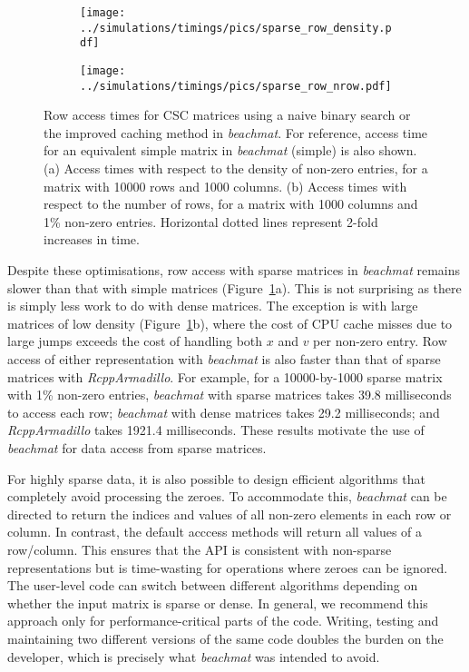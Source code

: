 \documentclass[10pt,letterpaper]{article}
\newcommand{\beachmat}{\textit{beachmat}}
\begin{document}
\begin{figure}[btp]
    \begin{subfigure}[b]{0.49\textwidth}
        \texttt{[image: ../simulations/timings/pics/sparse\_row\_density.pdf]}
        \caption{}
    \end{subfigure}
    \begin{subfigure}[b]{0.49\textwidth}
        \texttt{[image: ../simulations/timings/pics/sparse\_row\_nrow.pdf]}
        \caption{}
    \end{subfigure}
    \caption{Row access times for CSC matrices using a naive binary search or the improved caching method in \beachmat{}.
        For reference, access time for an equivalent simple matrix in \beachmat{} (simple) is also shown.
        (a) Access times with respect to the density of non-zero entries, for a matrix with 10000 rows and 1000 columns.
        (b) Access times with respect to the number of rows, for a matrix with 1000 columns and 1\% non-zero entries.
        Horizontal dotted lines represent 2-fold increases in time.
    }
    \label{fig:sparserow}
\end{figure}


Despite these optimisations, row access with sparse matrices in \beachmat{} remains slower than that with simple matrices (Figure~\ref{fig:sparserow}a).
This is not surprising as there is simply less work to do with dense matrices.
The exception is with large matrices of low density (Figure~\ref{fig:sparserow}b), where the cost of CPU cache misses due to large jumps exceeds the cost of handling both $x$ and $v$ per non-zero entry.
Row access of either representation with \beachmat{} is also faster than that of sparse matrices with \textit{RcppArmadillo}.
For example, for a 10000-by-1000 sparse matrix with 1\% non-zero entries, \beachmat{} with sparse matrices takes 39.8 milliseconds to access each row; \beachmat{} with dense matrices takes 29.2 milliseconds; and \textit{RcppArmadillo} takes 1921.4 milliseconds.
These results motivate the use of \beachmat{} for data access from sparse matrices.

For highly sparse data, it is also possible to design efficient algorithms that completely avoid processing the zeroes.
To accommodate this, \beachmat{} can be directed to return the indices and values of all non-zero elements in each row or column.
In contrast, the default acccess methods will return all values of a row/column.
This ensures that the API is consistent with non-sparse representations but is time-wasting for operations where zeroes can be ignored.
The user-level code can switch between different algorithms depending on whether the input matrix is sparse or dense.
In general, we recommend this approach only for performance-critical parts of the code.
Writing, testing and maintaining two different versions of the same code doubles the burden on the developer, which is precisely what \beachmat{} was intended to avoid.
\end{document}
